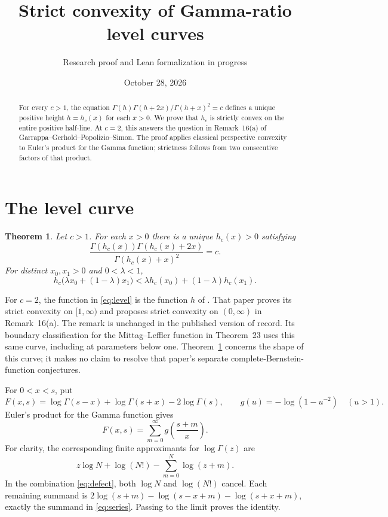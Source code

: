\documentclass[11pt]{article}
\title{Strict convexity of Gamma-ratio level curves}
\author{Research proof and Lean formalization in progress}
\date{October 28, 2026}
\newtheorem{theorem}{Theorem}
\begin{document}
\maketitle
\begin{abstract}
For every $c>1$, the equation
$\Gamma(h)\Gamma(h+2x)/\Gamma(h+x)^2=c$ defines a unique positive height
$h=h_c(x)$ for each $x>0$. We prove that $h_c$ is strictly convex on the
entire positive half-line. At $c=2$, this answers the question in Remark~16(a)
of Garrappa--Gerhold--Popolizio--Simon. The proof applies classical
perspective convexity to Euler's product for the Gamma function; strictness
follows from two consecutive factors of that product.
\end{abstract}

\section{The level curve}
\begin{theorem}\label{thm:main}
Let $c>1$. For each $x>0$ there is a unique $h_c(x)>0$ satisfying
\begin{equation}\label{eq:level}
 \frac{\Gamma(h_c(x))\Gamma(h_c(x)+2x)}{\Gamma(h_c(x)+x)^2}=c.
\end{equation}
For distinct $x_0,x_1>0$ and $0<\lambda<1$,
\[
 h_c\bigl(\lambda x_0+(1-\lambda)x_1\bigr)
 <\lambda h_c(x_0)+(1-\lambda)h_c(x_1).
\]
\end{theorem}

For $c=2$, the function in \eqref{eq:level} is the function $h$ of
\cite[Lemma~15]{GGPS}. That paper proves its strict convexity on
$[1,\infty)$ and proposes strict convexity on $(0,\infty)$ in
Remark~16(a). The remark is unchanged in the published version of record.
Its boundary classification for the Mittag--Leffler function in
Theorem~23 uses this same curve, including at parameters below one.
Theorem~\ref{thm:main} concerns the shape of this curve; it makes no claim
to resolve that paper's separate complete-Bernstein-function conjectures.

For $0<x<s$, put
\begin{equation}\label{eq:defect}
 F(x,s)=\log\Gamma(s-x)+\log\Gamma(s+x)-2\log\Gamma(s),
 \qquad g(u)=-\log(1-u^{-2})\quad(u>1).
\end{equation}
Euler's product for the Gamma function gives
\begin{equation}\label{eq:series}
 F(x,s)=\sum_{m=0}^{\infty}g\!\left(\frac{s+m}{x}\right).
\end{equation}
For clarity, the corresponding finite approximants for $\log\Gamma(z)$
are
\[
 z\log N+\log(N!)-\sum_{m=0}^{N}\log(z+m).
\]
In the combination \eqref{eq:defect}, both $\log N$ and $\log(N!)$
cancel. Each remaining summand is
$2\log(s+m)-\log(s-x+m)-\log(s+x+m)$, exactly the summand in
\eqref{eq:series}. Passing to the limit proves the identity.
\end{document}
